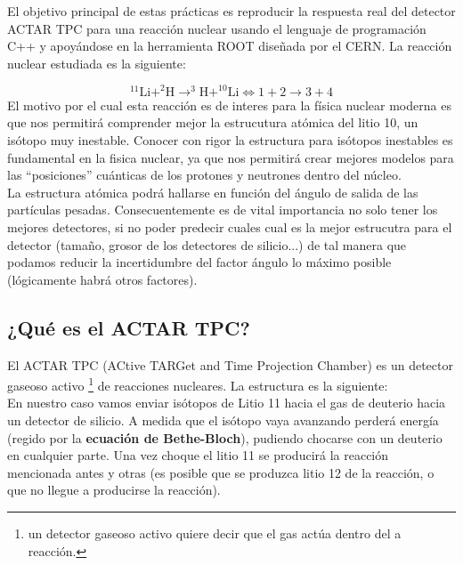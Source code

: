 \documentclass[12pt,a4paper]{article}
\numberwithin{equation}{section}
\numberwithin{figure}{section}
\begin{document}
El objetivo principal de estas prácticas es reproducir la respuesta real del detector ACTAR TPC para una reacción nuclear usando el lenguaje de programación C++ y apoyándose en la herramienta ROOT diseñada por el CERN. La reacción nuclear estudiada es la siguiente:

\begin{equation}
    ^{11}\mathrm{Li}+^2\mathrm{H} \rightarrow ^3\mathrm{H}+^{10}\mathrm{Li} \Longleftrightarrow 1 + 2 \rightarrow 3 + 4
\end{equation}
El motivo por el cual esta reacción es de interes para la física nuclear moderna es que nos permitirá comprender mejor la estrucutura atómica del litio 10, un isótopo muy inestable. Conocer con rigor la estructura para isótopos inestables es fundamental en la fisica nuclear, ya que nos permitirá crear mejores modelos para las ``posiciones'' cuánticas de los protones y neutrones dentro del núcleo. \\ 

La estructura atómica podrá hallarse en función del ángulo de salida de las partículas pesadas. Consecuentemente es de vital importancia no solo tener los mejores detectores, si no poder predecir cuales cual es la mejor estrucutra para el detector (tamaño, grosor de los detectores de silicio...) de tal manera que podamos reducir la incertidumbre del factor ángulo lo máximo posible (lógicamente habrá otros factores).

\subsection{¿Qué es el ACTAR TPC?}

El ACTAR TPC (ACtive TARGet and Time Projection Chamber) es un detector gaseoso activo \footnote{un detector gaseoso activo quiere decir que el gas actúa dentro del a reacción.} de reacciones nucleares. La estructura es la siguiente: \\


En nuestro caso vamos enviar isótopos de Litio 11 hacia el gas de deuterio hacia un detector de silicio. A medida que el isótopo vaya avanzando perderá energía (regido por la {\bf ecuación de Bethe-Bloch}), pudiendo  chocarse con un deuterio en cualquier parte. Una vez choque el litio 11 se producirá la reacción mencionada antes y otras (es posible que se produzca litio 12 de la reacción, o que no llegue a producirse la reacción). \\
\end{document}

